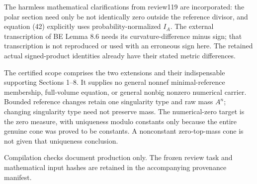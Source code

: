 \documentclass[
  10pt,
]{article}
\begin{document}
The harmless mathematical clarifications from review119 are
incorporated: the polar section need only be not identically zero
outside the reference divisor, and equation (42) explicitly uses
probability-normalized \(I_A\). The external transcription of BE Lemma
8.6 needs its curvature-difference minus sign; that transcription is not
reproduced or used with an erroneous sign here. The retained actual
signed-product identities already have their stated metric differences.

The certified scope comprises the two extensions and their indispensable
supporting Sections 1--8. It supplies no general nonnef
minimal-reference membership, full-volume equation, or general nonbig
nonzero numerical carrier. Bounded reference changes retain one
singularity type and raw mass \(A^n\); changing singularity type need
not preserve mass. The numerical-zero target is the zero measure, with
uniqueness modulo constants only because the entire genuine cone was
proved to be constants. A nonconstant zero-top-mass cone is not given
that uniqueness conclusion.

Compilation checks document production only. The frozen review task and
mathematical input hashes are retained in the accompanying provenance
manifest.
\end{document}
